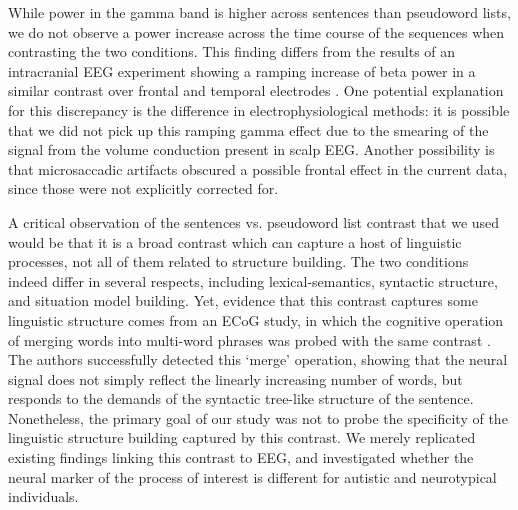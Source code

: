 While power in the gamma band is higher across sentences than pseudoword lists, we do not observe a power increase across the time course of the sequences when contrasting the two conditions. This finding differs from the results of an intracranial EEG experiment showing a ramping increase of beta power in a similar contrast over frontal and temporal electrodes \citep{fedorenko2016}. One potential explanation for this discrepancy is the difference in electrophysiological methods: it is possible that we did not pick up this ramping gamma effect due to the smearing of the signal from the volume conduction present in scalp EEG. Another possibility is that microsaccadic artifacts obscured a possible frontal effect in the current data, since those were not explicitly corrected for.   

A critical observation of the sentences vs. pseudoword list contrast that we used would be that it is a broad contrast which can capture a host of linguistic processes, not all of them related to structure building. The two conditions indeed differ in several respects, including lexical-semantics, syntactic structure, and situation model building. Yet, evidence that this contrast captures some linguistic structure comes from an ECoG study, in which the cognitive operation of merging words into multi-word phrases was probed with the same contrast \citep{nelson2017}. The authors successfully detected this `merge' operation, showing that the neural signal does not simply reflect the linearly increasing number of words, but responds to the demands of the syntactic tree-like structure of the sentence. Nonetheless, the primary goal of our study was not to probe the specificity of  the linguistic structure building captured by this contrast. We merely replicated existing findings linking this contrast to EEG, and investigated whether the neural marker of the process of interest is different for autistic and neurotypical individuals. 


